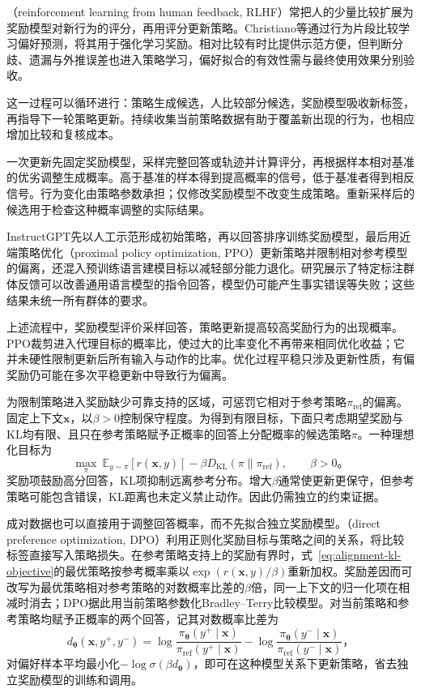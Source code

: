 （reinforcement learning from human feedback, RLHF）常把人的少量比较扩展为奖励模型对新行为的评分，再用评分更新策略。Christiano等通过行为片段比较学习偏好预测，将其用于强化学习奖励。相对比较有时比提供示范方便，但判断分歧、遗漏与外推误差也进入策略学习，偏好拟合的有效性需与最终使用效果分别验收。

这一过程可以循环进行：策略生成候选，人比较部分候选，奖励模型吸收新标签，再指导下一轮策略更新。持续收集当前策略数据有助于覆盖新出现的行为，也相应增加比较和复核成本。

一次更新先固定奖励模型，采样完整回答或轨迹并计算评分，再根据样本相对基准的优劣调整生成概率。高于基准的样本得到提高概率的信号，低于基准者得到相反信号。行为变化由策略参数承担；仅修改奖励模型不改变生成策略。重新采样后的候选用于检查这种概率调整的实际结果。

InstructGPT先以人工示范形成初始策略，再以回答排序训练奖励模型，最后用近端策略优化（proximal policy optimization, PPO）更新策略并限制相对参考模型的偏离，还混入预训练语言建模目标以减轻部分能力退化。研究展示了特定标注群体反馈可以改善通用语言模型的指令回答，模型仍可能产生事实错误等失败；这些结果未统一所有群体的要求。

上述流程中，奖励模型评价采样回答，策略更新提高较高奖励行为的出现概率。PPO裁剪进入代理目标的概率比，使过大的比率变化不再带来相同优化收益；它并未硬性限制更新后所有输入与动作的比率。优化过程平稳只涉及更新性质，有偏奖励仍可能在多次平稳更新中导致行为偏离。

为限制策略进入奖励缺少可靠支持的区域，可惩罚它相对于参考策略$\pi_{\mathrm{ref}}$的偏离。固定上下文$\bm{x}$，以$\beta>0$控制保守程度。为得到有限目标，下面只考虑期望奖励与KL均有限、且只在参考策略赋予正概率的回答上分配概率的候选策略$\pi$。一种理想化目标为
\begin{equation}
 \max_\pi\
 \mathbb E_{y\sim\pi}[r(\bm{x},y)]
 -\beta D_{\mathrm{KL}}(\pi\|\pi_{\mathrm{ref}}),
 \qquad \beta>0\text{。}
 \label{eq:alignment-kl-objective}
\end{equation}
奖励项鼓励高分回答，KL项抑制远离参考分布。增大$\beta$通常使更新更保守，但参考策略可能包含错误，KL距离也未定义禁止动作。因此仍需独立的约束证据。

成对数据也可以直接用于调整回答概率，而不先拟合独立奖励模型。（direct preference optimization, DPO）利用正则化奖励目标与策略之间的关系，将比较标签直接写入策略损失。在参考策略支持上的奖励有界时，式~\eqref{eq:alignment-kl-objective}的最优策略按参考概率乘以$\exp(r(\bm{x},y)/\beta)$重新加权。奖励差因而可改写为最优策略相对参考策略的对数概率比差的$\beta$倍，同一上下文的归一化项在相减时消去；DPO据此用当前策略参数化Bradley--Terry比较模型。对当前策略和参考策略均赋予正概率的两个回答，记其对数概率比差为
\[
 d_{\bm{\theta}}(\bm{x},y^+,y^-)
 =\log\frac{\pi_{\bm{\theta}}(y^+\mid\bm{x})}
              {\pi_{\mathrm{ref}}(y^+\mid\bm{x})}
 -\log\frac{\pi_{\bm{\theta}}(y^-\mid\bm{x})}
              {\pi_{\mathrm{ref}}(y^-\mid\bm{x})}\text{，}
\]
对偏好样本平均最小化$-\log\sigma(\beta d_{\bm\theta})$，即可在这种模型关系下更新策略，省去独立奖励模型的训练和调用。

